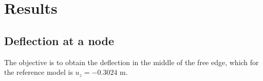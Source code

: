 \documentclass[english,a4paper,12pt]{article}
\begin{document}

\section{Results}
\label{sec:resultados}
\subsection{Deflection at a node}

The objective is to obtain the deflection in the middle of the free edge, which for the reference model is  $u_{z}=-0.3024$ m.
\end{document}

